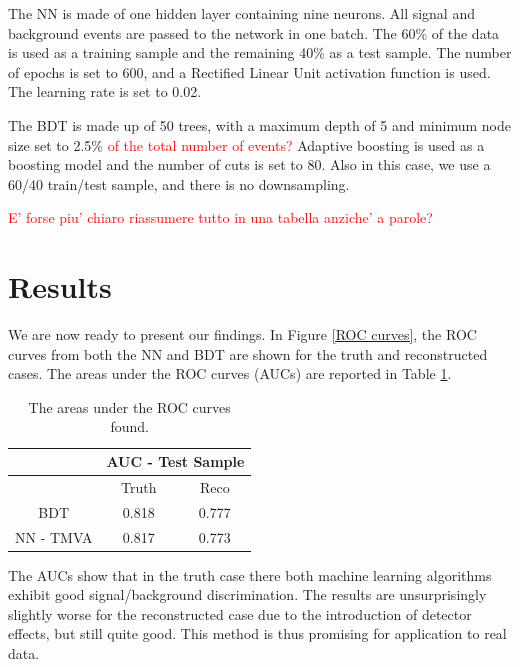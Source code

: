 \documentclass[10pt,a4paper]{book}
\newcommand\todo[1]{\textcolor{red}{#1}}
\begin{document}
The NN is made of one hidden layer containing nine neurons. All signal and background events are passed to the network in one batch. The 60\% of the data is used as a training sample and the remaining 40\% as a test sample. The number of epochs is set to 600, and a Rectified Linear Unit activation function is used. The learning rate is set to 0.02. 

The BDT is made up of 50 trees, with a maximum depth of 5 and minimum node size set to 2.5\% \todo{of the total number of events?} Adaptive boosting is used as a boosting model and the number of cuts is set to 80. Also in this case, we use a 60/40 train/test sample, and there is no downsampling.

\todo{E' forse piu' chiaro riassumere tutto in una tabella anziche' a parole?}

\section{Results}

We are now ready to present our findings. In Figure \ref{ROC curves}, the ROC curves from both the NN and BDT are shown for the truth and reconstructed cases. The areas under the ROC curves (AUCs) are reported in Table \ref{AUC table}.

\begin{table}
\centering
\begin{tabular}{|c|c|c|}
\hline 
\* & \multicolumn{2}{c|}{AUC - Test Sample} \\ 
\hline 
\* & Truth & Reco \\ 
\hline 
BDT & 0.818 & 0.777 \\ 
\hline 
NN - TMVA & 0.817 & 0.773 \\  
\hline 
\end{tabular} 
\caption{The areas under the ROC curves found.}
\label{AUC table}
\end{table} 

The AUCs show that in the truth case there both machine learning algorithms exhibit good signal/background discrimination. The results are unsurprisingly slightly worse for the reconstructed case due to the introduction of detector effects, but still quite good. This method is thus promising for application to real data.
\end{document}
